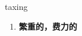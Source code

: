 
\begin{frame}
{\huge taxing}
\begin{center}
\begin{enumerate}\Large
  \item \textbf{繁重的，费力的}
\end{enumerate}
\end{center}
\end{frame}
